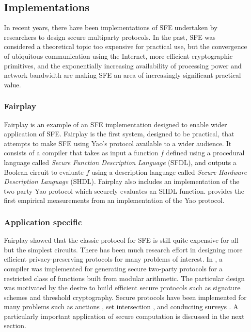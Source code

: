 \subsection{Implementations}

In recent years, there have been implementations of SFE undertaken
by researchers to design secure multiparty protocols. In the past,
SFE was considered a theoretical topic too expensive for practical
use, but the convergence of ubiquitous communication using the Internet,
more efficient cryptographic primitives, and the exponentially increasing
availability of processing power and network bandwidth are making
SFE an area of increasingly significant practical value.


\subsubsection{Fairplay}

Fairplay \cite{Fairplay} is an example of an SFE implementation designed
to enable wider application of SFE. Fairplay is the first system,
designed to be practical, that attempts to make SFE using Yao's protocol
available to a wider audience. It consists of a compiler that takes
as input a function $f$ defined using a procedural language called
\emph{Secure Function Description Language} (SFDL), and outputs a
Boolean circuit to evaluate $f$ using a description language called
\emph{Secure Hardware Description Language} (SHDL). Fairplay also
includes an implementation of the two party Yao protocol which securely
evaluates an SHDL function. \cite{Fairplay} provides the first empirical
measurements from an implementation of the Yao protocol.


\subsubsection{Application specific}

Fairplay showed that the classic protocol for SFE is still quite expensive
for all but the simplest circuits. There has been much research effort
in designing more efficient privacy-preserving protocols for many
problems of interest. In \cite{Reiter:CCS:2003}, a compiler was implemented
for generating secure two-party protocols for a restricted class of
functions built from modular arithmetic. The particular design was
motivated by the desire to build efficient secure protocols such as
signature schemes and threshold cryptography. Secure protocols have
been implemented for many problems such as auctions \cite{NPS99},
set intersection \cite{FNP04}, and conducting surveys \cite{FNP04}.
A particularly important application of secure computation is discussed
in the next section.


